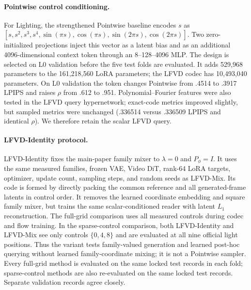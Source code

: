 \paragraph{Pointwise control conditioning.}
For Lighting, the strengthened Pointwise baseline encodes $s$ as
$[s,s^2,s^3,s^4,\sin(\pi s),\cos(\pi s),\sin(2\pi s),\cos(2\pi s)]$.
Two zero-initialized projections inject this vector as a latent bias and as an
additional 4096-dimensional context token through an 8--128--4096 MLP. The
design is selected on L0 validation before the five test folds are evaluated.
It adds 529,968 parameters to the 161,218,560 LoRA parameters; the LFVD codec
has 10,493,040 parameters. On L0 validation the token changes Pointwise from
.4514 to .3917 LPIPS and raises $\rho$ from .612 to .951. Polynomial--Fourier
features were also tested in the LFVD query hypernetwork; exact-code metrics
improved slightly, but sampled metrics were unchanged (.336514 versus .336509
LPIPS and identical $\rho$). We therefore retain the scalar LFVD query.

\paragraph{LFVD-Identity protocol.}
LFVD-Identity fixes the main-paper family mixer to $\lambda=0$ and $P_\phi=I$.
It uses the same measured families, frozen VAE, Video DiT,
rank-64 LoRA targets, optimizer, update count, sampling steps, and random
seeds as LFVD-Mix. Its code is formed by directly packing the common reference
and all generated-frame latents in control order.  It removes the learned
coordinate embedding and square family mixer, but trains the same
scalar-conditioned reader with latent $L_1$ reconstruction.  The full-grid
comparison uses all measured controls during codec and flow training.  In the
sparse-control comparison, both LFVD-Identity and LFVD-Mix see only controls
$\{0,4,8\}$ and are evaluated at all nine official light positions.  Thus the
variant tests family-valued generation and learned post-hoc querying without
learned family-coordinate mixing; it is not a Pointwise sampler.
Every full-grid method is evaluated on the same locked test records in each
fold; sparse-control methods are also re-evaluated on the same locked test
records. Separate validation records agree closely.


